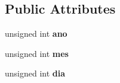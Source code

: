 \subsection*{Public Attributes}
\begin{DoxyCompactItemize}
\item 
\hypertarget{class_data_a1811fab972bdf6ed644c4eb7412bd043}{unsigned int {\bfseries ano}}\label{class_data_a1811fab972bdf6ed644c4eb7412bd043}

\item 
\hypertarget{class_data_a586deb479ec2031a0d3ceec8280f7706}{unsigned int {\bfseries mes}}\label{class_data_a586deb479ec2031a0d3ceec8280f7706}

\item 
\hypertarget{class_data_a71a904380d17858da0b902e9a2563546}{unsigned int {\bfseries dia}}\label{class_data_a71a904380d17858da0b902e9a2563546}

\end{DoxyCompactItemize}
